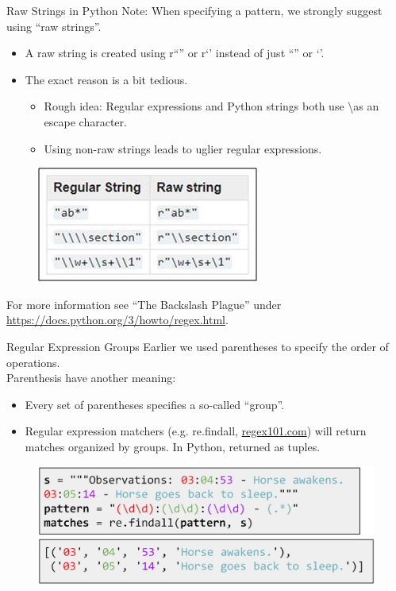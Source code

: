\documentclass[aspectratio=169]{../latex_main/tntbeamer}  %
\begin{document}
	
	\begin{frame}{Raw Strings in Python}
    	Note: When specifying a pattern, we strongly suggest using “raw strings”. 
    	\begin{itemize}
    	    \item A raw string is created using r“” or r‘’ instead of just “” or ‘’.
    	    \item The exact reason is a bit tedious.
    	    \begin{itemize}
    	        \item Rough idea: Regular expressions and Python strings both use \textbackslash as an escape character. 
    	        \item Using non-raw strings leads to uglier regular expressions.
    	    \end{itemize}
    	\end{itemize}
    	\begin{figure}
    	    \centering
    	    \includegraphics[scale=.5]{Bild21}
    	\end{figure}
	    
	    
	    
	    For more information see “The Backslash Plague” under \\
	    \url{https://docs.python.org/3/howto/regex.html}.
	\end{frame}
	
	
	\begin{frame}{Regular Expression Groups}
    	Earlier we used parentheses to specify the order of operations.\\
    	Parenthesis have another meaning:
    	\begin{itemize}
    	    \item Every set of parentheses specifies a so-called “group”. 
    	    \item Regular expression matchers (e.g. re.findall, \url{regex101.com}) will return matches organized by groups. In Python, returned as tuples.
    	\end{itemize}
    	\begin{figure}
    	    \centering
    	    \includegraphics[scale=.35]{Bild22}
    	\end{figure}
	\end{frame}
	
\end{document}
